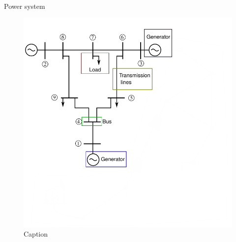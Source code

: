 \documentclass[hyperref={colorlinks,citecolor=blue,linkcolor=blue,urlcolor=blue}]{beamer}
\begin{document}
\begin{frame}{Power system} 
\begin{figure}
    \centering
    \includegraphics[scale=0.6]{figures/power_labels.pdf}
    \caption{Caption}
    \label{fig:power-labels}
\end{figure}
\end{frame}
\end{document}
